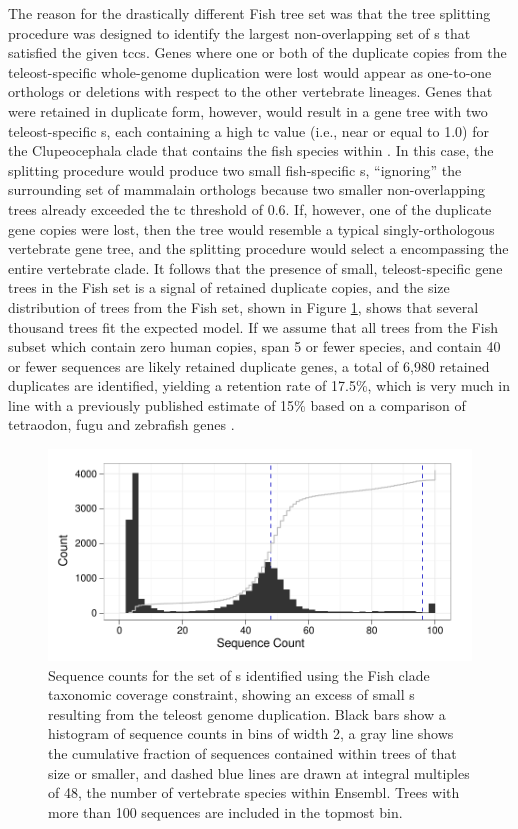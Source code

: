 The reason for the drastically different Fish tree set was that the
tree splitting procedure was designed to identify the largest
non-overlapping set of \subtr{}s that satisfied the given
\acp{tcc}. Genes where one or both of the duplicate copies from the
teleost-specific whole-genome duplication were lost would appear as
one-to-one orthologs or deletions with respect to the other vertebrate
lineages. Genes that were retained in duplicate form, however, would
result in a gene tree with two teleost-specific \subtr{}s, each
containing a high \ac{tc} value (i.e., near or equal to 1.0) for the
Clupeocephala clade that contains the fish species within \ens. In
this case, the splitting procedure would produce two small
fish-specific \subtr{}s, ``ignoring'' the surrounding set of mammalain
orthologs because two smaller non-overlapping trees already exceeded
the \ac{tc} threshold of 0.6. If, however, one of the duplicate gene
copies were lost, then the tree would resemble a typical
singly-orthologous vertebrate gene tree, and the splitting procedure
would select a \subtr encompassing the entire vertebrate clade. It
follows that the presence of small, teleost-specific gene trees in the
Fish set is a signal of retained duplicate copies, and the size
distribution of trees from the Fish set, shown in Figure
\ref{ensembl_fish_hist}, shows that several thousand trees fit the
expected model. If we assume that all trees from the Fish subset which
contain zero human copies, span 5 or fewer species, and contain 40 or
fewer sequences are likely retained duplicate genes, a total of 6,980
retained duplicates are identified, yielding a retention rate of
17.5\%, which is very much in line with a previously published
estimate of 15\% based on a comparison of tetraodon, fugu and
zebrafish genes \citep{Brunet2006}.

\begin{figure}
\centering
\includegraphics[scale=0.9]{Figs/ensembl_fish_hist.pdf}
\caption{Sequence counts for the set of \subtr{}s identified using the
  Fish clade taxonomic coverage constraint, showing an excess of small
  \subtr{}s resulting from the teleost genome duplication. Black bars
  show a histogram of sequence counts in bins of width 2, a gray line
  shows the cumulative fraction of sequences contained within trees of
  that size or smaller, and dashed blue lines are drawn at integral
  multiples of 48, the number of vertebrate species within
  Ensembl. Trees with more than 100 sequences are included in the
  topmost bin.}
\label{ensembl_fish_hist}
\end{figure}

